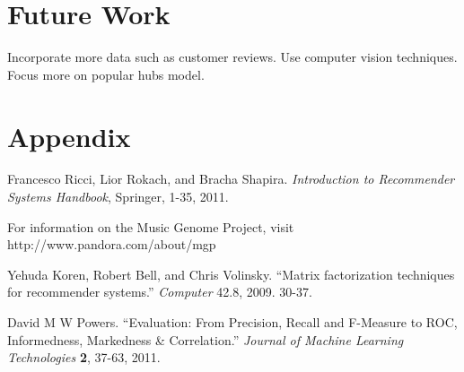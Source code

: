 \documentclass[11pt]{article}
\begin{document}
\section*{Future Work}
Incorporate more data such as customer reviews. Use computer vision techniques.
Focus more on popular hubs model.

\section*{Appendix}

\begin{thebibliography}{9}

    Francesco Ricci, Lior Rokach, and Bracha Shapira.
    \emph{Introduction to Recommender Systems Handbook}, Springer, 1-35, 2011.

    For information on the Music Genome Project, visit
    http://www.pandora.com/about/mgp

    Yehuda Koren, Robert Bell, and Chris Volinsky.
    ``Matrix factorization techniques for recommender systems.''
    \emph{Computer} 42.8, 2009. 30-37.

    David M W Powers.
    ``Evaluation: From Precision, Recall and F-Measure to ROC, Informedness,
Markedness \& Correlation.''
    \emph{Journal of Machine Learning Technologies} \textbf{2}, 37-63, 2011.

\end{thebibliography}
\end{document}
